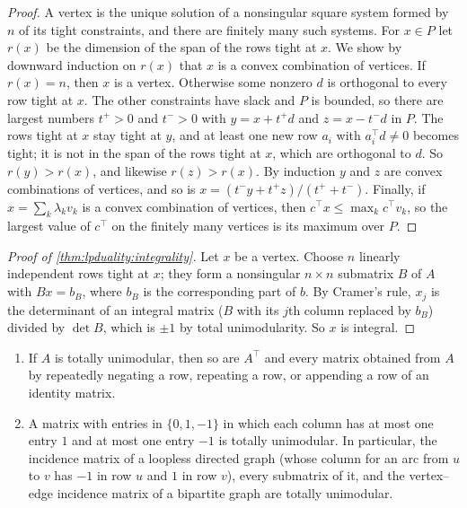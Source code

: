 \begin{refsection}
\begin{proof}
A vertex is the unique solution of a nonsingular square system formed by $n$ of its tight constraints, and there are finitely many such systems. For $x\in P$ let $r(x)$ be the dimension of the span of the rows tight at $x$. We show by downward induction on $r(x)$ that $x$ is a convex combination of vertices. If $r(x)=n$, then $x$ is a vertex. Otherwise some nonzero $d$ is orthogonal to every row tight at $x$. The other constraints have slack and $P$ is bounded, so there are largest numbers $t^+>0$ and $t^->0$ with $y=x+t^+d$ and $z=x-t^-d$ in $P$. The rows tight at $x$ stay tight at $y$, and at least one new row $a_i$ with $a_i^\top d\ne0$ becomes tight; it is not in the span of the rows tight at $x$, which are orthogonal to $d$. So $r(y)>r(x)$, and likewise $r(z)>r(x)$. By induction $y$ and $z$ are convex combinations of vertices, and so is $x=(t^-y+t^+z)/(t^++t^-)$. Finally, if $x=\sum_k\lambda_kv_k$ is a convex combination of vertices, then $c^\top x\le\max_kc^\top v_k$, so the largest value of $c^\top$ on the finitely many vertices is its maximum over $P$.
\end{proof}

\begin{proof}[Proof of \cref{thm:lpduality:integrality}]
Let $x$ be a vertex. Choose $n$ linearly independent rows tight at $x$; they form a nonsingular $n\times n$ submatrix $B$ of $A$ with $Bx=b_B$, where $b_B$ is the corresponding part of $b$. By Cramer's rule, $x_j$ is the determinant of an integral matrix ($B$ with its $j$th column replaced by $b_B$) divided by $\det B$, which is $\pm1$ by total unimodularity. So $x$ is integral.
\end{proof}

\begin{lemma}\label{lem:lpduality:incidence}
\leavevmode
\begin{enumerate}
\item If $A$ is totally unimodular, then so are $A^\top$ and every matrix obtained from $A$ by repeatedly negating a row, repeating a row, or appending a row of an identity matrix.
\item A matrix with entries in $\{0,1,-1\}$ in which each column has at most one entry $1$ and at most one entry $-1$ is totally unimodular. In particular, the incidence matrix of a loopless directed graph (whose column for an arc from $u$ to $v$ has $-1$ in row $u$ and $1$ in row $v$), every submatrix of it, and the vertex--edge incidence matrix of a bipartite graph are totally unimodular.
\end{enumerate}
\end{lemma}


\end{refsection}
